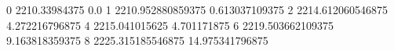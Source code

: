 0 2210.33984375 0.0
1 2210.952880859375 0.613037109375
2 2214.612060546875 4.272216796875
4 2215.041015625 4.701171875
6 2219.503662109375 9.163818359375
8 2225.315185546875 14.975341796875
